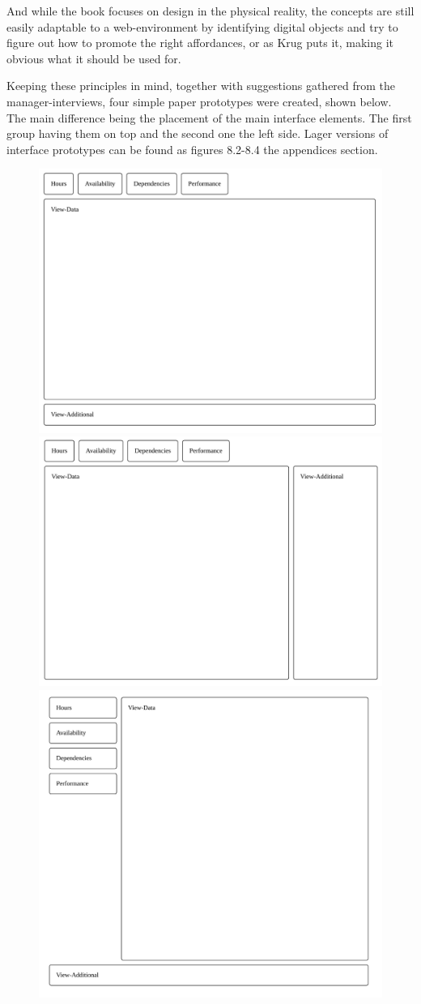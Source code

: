 {  And while the book focuses on design in the physical reality, the concepts
  are still easily adaptable to a web-environment by identifying digital objects and
  try to figure out how to promote the right affordances, or as Krug puts it, making
  it obvious what it should be used for.

  Keeping these principles in mind, together with suggestions
  gathered from the manager-interviews, four simple paper prototypes were
  created, shown below. The main difference being the placement of the main
  interface elements. The first group having them on top and the second one the
  left side. Lager versions of interface prototypes can be found as figures
  8.2-8.4 the appendices section.

    \begin{figure}[h!]
      \center
      \includegraphics[valign=t,trim={.10cm .10cm .35cm .25cm},clip,width=.49\linewidth]{ui11.pdf}
      \includegraphics[valign=t,trim={.15cm .30cm .20cm .20cm},clip,width=.49\linewidth]{ui12.pdf}
      \includegraphics[valign=t,trim={.45cm .55cm .65cm .35cm},clip,width=.49\linewidth]{ui13.pdf}

\end{figure}}
